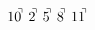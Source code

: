 \documentclass[preview]{standalone}
\begin{document}
\begin{align*}
10^{\hspace{-0.1cm}\urcorner} \ 2^{\hspace{-0.1cm}\urcorner} \ 5^{\hspace{-0.1cm}\urcorner} \ 8^{\hspace{-0.1cm}\urcorner} \ 11^{\hspace{-0.1cm}\urcorner}
\end{align*}
\end{document}
